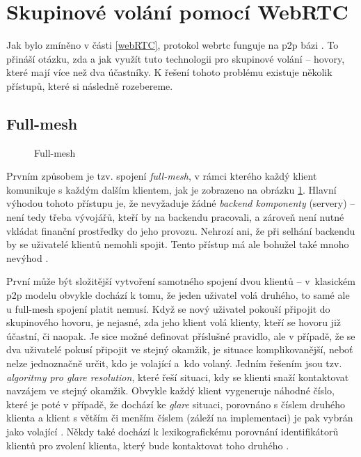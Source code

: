 \section{Skupinové volání pomocí WebRTC}\label{connectionModels}

Jak bylo zmíněno v části \ref{webRTC}, protokol \gls{webrtc} funguje na
\gls{p2p} bázi \parencite{WebRTCORG-PeerConnections}. To přináší otázku, zda a
jak využít tuto technologii pro skupinové volání -- hovory, které mají více než
dva účastníky. K řešení tohoto problému existuje několik přístupů, které si
následně rozebereme.

\subsection{Full-mesh}

\begin{figure}[H]
    \centering
    \caption{Full-mesh}
    \label{fullMeshFig}
\end{figure}

Prvním způsobem je tzv. spojení \textit{full-mesh}, v rámci kterého každý klient
komunikuje s každým dalším klientem, jak je zobrazeno na obrázku
\ref{fullMeshFig}. Hlavní výhodou tohoto přístupu je, že nevyžaduje žádné
\textit{backend komponenty} (servery) -- není tedy třeba vývojářů, kteří by na
backendu pracovali, a zároveň není nutné vkládat finanční prostředky do jeho
provozu. Nehrozí ani, že při selhání backendu by se uživatelé klientů nemohli
spojit. Tento přístup má ale bohužel také mnoho nevýhod
\parencite{HalOpenScience-SFUs}.

První může být složitější vytvoření samotného spojení dvou klientů --
v~klasickém \gls{p2p} modelu obvykle dochází k tomu, že jeden uživatel volá
druhého, to samé ale u full-mesh spojení platit nemusí. Když se nový uživatel
pokouší připojit do skupinového hovoru, je nejasné, zda jeho klient volá
klienty, kteří se hovoru již účastní, či naopak. Je sice možné definovat
příslušné pravidlo, ale v případě, že se dva uživatelé pokusí připojit ve stejný
okamžik, je situace komplikovanější, neboť nelze jednoznačně určit, kdo je
volající a~kdo volaný. Jedním řešením jsou tzv. \textit{algoritmy pro glare
    resolution}, které řeší situaci, kdy se klienti snaží kontaktovat navzájem ve
stejný okamžik. Obvykle každý klient vygeneruje náhodné číslo, které je poté v
případě, že dochází ke \textit{glare} situaci, porovnáno s číslem druhého
klienta a klient s větším či menším číslem (záleží na implementaci) je pak
vybrán jako volající \parencite{MagnusWesterlund-GlareInWebRTC}. Někdy také
dochází k lexikografickému porovnání identifikátorů klientů pro zvolení klienta,
který bude kontaktovat toho druhého \parencite{GitHub-MSC3401}.

